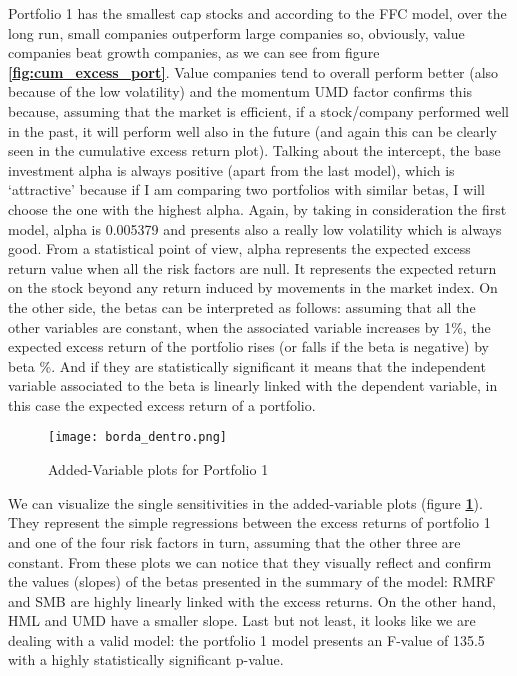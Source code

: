 \documentclass[11pt]{article}
\begin{document}
Portfolio 1 has the smallest cap stocks and according to the FFC model, over the long run, small companies outperform large companies so, obviously, value companies beat 
growth companies, as we can see from figure \textbf{\ref{fig:cum_excess_port}}. Value companies tend to overall perform better (also because of the low volatility) and 
the momentum UMD factor confirms this because, assuming that the market is efficient, if a stock/company performed well in the past, it will perform well also in the future 
(and again this can be clearly seen in the cumulative excess return plot).
Talking about the intercept, the base investment alpha is always positive (apart from the last model), which is ‘attractive’ because if I am comparing two portfolios with 
similar betas, I will choose the one with the highest alpha. Again, by taking in consideration the first model, alpha is 0.005379 and presents also a really low volatility which 
is always good. From a statistical point of view, alpha represents the expected excess return value when all the risk factors are null. It represents the expected return on 
the stock beyond any return induced by movements in the market index.\newline
On the other side, the betas can be interpreted as follows: assuming that all the other variables are constant, when the associated variable increases by 1\%, 
the expected excess return of the portfolio rises (or falls if the beta is negative) by beta \%. And if they are statistically significant it means that the independent 
variable associated to the beta is linearly linked with the dependent variable, in this case the expected excess return of a portfolio.
\begin{figure}[H]
    \begin{center}
        \texttt{[image: borda\_dentro.png]}
    \end{center}
    \caption{Added-Variable plots for Portfolio 1}
    \label{fig:add_v_p1}
\end{figure}
We can visualize the single sensitivities in the added-variable plots (figure \textbf{\ref{fig:add_v_p1}}). They represent the simple regressions between the excess returns of portfolio 1
and one of the four risk factors in turn, assuming 
that the other three are constant. From these plots we can notice that they visually reflect and confirm the values (slopes) of the betas presented in the summary of the model: 
RMRF and SMB are highly linearly linked with the excess returns. On the other hand, HML and UMD have a smaller slope.
Last but not least, it looks like we are dealing with a valid model: the portfolio 1 model presents an F-value of 135.5 with a highly statistically significant p-value.\newline 
\end{document}
